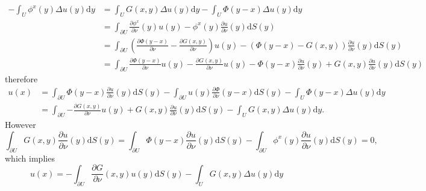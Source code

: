 $$
\begin{aligned}
-\int_U{\phi ^x\left( y \right) \Delta u\left( y \right) \mathrm{d}y}&=\int_U{G\left( x,y \right) \Delta u\left( y \right) \mathrm{d}y}-\int_U{\Phi \left( y-x \right) \Delta u\left( y \right) \mathrm{d}y}
\\
&=\int_{\partial U}{\frac{\partial \phi ^x}{\partial \nu}\left( y \right) u\left( y \right) -\phi ^x\left( y \right) \frac{\partial u}{\partial \nu}\left( y \right) \mathrm{d}S\left( y \right)}
\\
&=\int_{\partial U}{\left( \frac{\partial \Phi \left( y-x \right)}{\partial \nu}-\frac{\partial G\left( x,y \right)}{\partial \nu} \right) u\left( y \right) -\left( \Phi \left( y-x \right) -G\left( x,y \right) \right) \frac{\partial u}{\partial \nu}\left( y \right) \mathrm{d}S\left( y \right)}
\\
&=\int_{\partial U}{\frac{\partial \Phi \left( y-x \right)}{\partial \nu}u\left( y \right) -\frac{\partial G\left( x,y \right)}{\partial \nu}u\left( y \right) -\Phi \left( y-x \right) \frac{\partial u}{\partial \nu}\left( y \right) +G\left( x,y \right) \frac{\partial u}{\partial \nu}\left( y \right) \mathrm{d}S\left( y \right)}
\end{aligned}
$$
therefore 
$$
\begin{aligned}
u\left( x \right) &=\int_{\partial U}{\Phi \left( y-x \right) \frac{\partial u}{\partial \nu}\left( y \right) \mathrm{d}S\left( y \right)}-\int_{\partial U}{u\left( y \right) \frac{\partial \Phi}{\partial \nu}\left( y-x \right) \mathrm{d}S\left( y \right)}-\int_U{\Phi \left( y-x \right) \Delta u\left( y \right) \mathrm{d}y}
\\
&=\int_{\partial U}{-\frac{\partial G\left( x,y \right)}{\partial \nu}u\left( y \right) +G\left( x,y \right) \frac{\partial u}{\partial \nu}\left( y \right) \mathrm{d}S\left( y \right)}-\int_U{G\left( x,y \right) \Delta u\left( y \right) \mathrm{d}y}.
\end{aligned}
$$
However 
$$
\int_{\partial U}{G\left( x,y \right) \frac{\partial u}{\partial \nu}\left( y \right) \mathrm{d}S\left( y \right)}=\int_{\partial U}{\Phi \left( y-x \right) \frac{\partial u}{\partial \nu}\left( y \right) \mathrm{d}S\left( y \right)}-\int_{\partial U}{\phi ^x\left( y \right) \frac{\partial u}{\partial \nu}\left( y \right) \mathrm{d}S\left( y \right)}=0,
$$
which implies 
\begin{equation}\label{1.18}
u\left( x \right) =-\int_{\partial U}{\frac{\partial G}{\partial \nu}\left( x,y \right) u\left( y \right) \mathrm{d}S\left( y \right)}-\int_U{G\left( x,y \right) \Delta u\left( y \right) \mathrm{d}y}
\end{equation}
